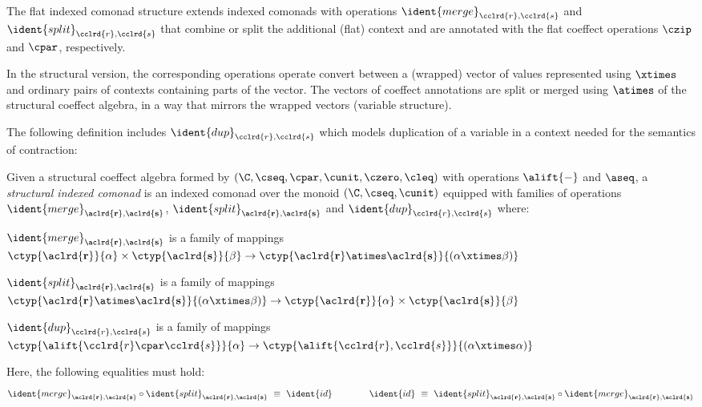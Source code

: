 The flat indexed comonad structure extends indexed comonads with operations
$\ident{merge}_{\cclrd{r},\cclrd{s}}$ and $\ident{split}_{\cclrd{r},\cclrd{s}}$ that combine or
split the additional (flat) context and are annotated with the flat coeffect operations $\czip$
and $\cpar$, respectively.

In the structural version, the corresponding operations operate convert between a (wrapped) vector
of values represented using $\xtimes$ and ordinary pairs of contexts containing parts of the vector.
The vectors of coeffect annotations are split or merged using $\atimes$ of the structural coeffect
algebra, in a way that mirrors the wrapped vectors (variable structure).

The following definition includes $\ident{dup}_{\cclrd{r}, \cclrd{s}}$ which models
duplication of a variable in a context needed for the semantics of contraction:

\begin{definition}
Given a structural coeffect algebra formed by $(\C, \cseq, \cpar, \cunit, \czero, \cleq)$
with operations $\alift{-}$ and $\aseq$, a \emph{structural indexed comonad} is an indexed comonad over
the monoid $(\C, \cseq, \cunit)$ equipped with families of operations $\ident{merge}_{\aclrd{\textbf{r}},\aclrd{\textbf{s}}}$,
$\ident{split}_{\aclrd{\textbf{r}},\aclrd{\textbf{s}}}$ and $\ident{dup}_{\cclrd{r}, \cclrd{s}}$ where:
%
\begin{compactitem}
\item $\ident{merge}_{\aclrd{\textbf{r}},\aclrd{\textbf{s}}}$ is a family of mappings
  $\ctyp{\aclrd{\textbf{r}}}{\alpha} \times \ctyp{\aclrd{\textbf{s}}}{\beta} \rightarrow \ctyp{\aclrd{\textbf{r}}\atimes\aclrd{\textbf{s}}}{(\alpha \xtimes \beta)}$
\item $\ident{split}_{\aclrd{\textbf{r}},\aclrd{\textbf{s}}}$ is a family of mappings
  $\ctyp{\aclrd{\textbf{r}}\atimes\aclrd{\textbf{s}}}{(\alpha \xtimes \beta)} \rightarrow \ctyp{\aclrd{\textbf{r}}}{\alpha} \times \ctyp{\aclrd{\textbf{s}}}{\beta}$
\item $\ident{dup}_{\cclrd{r}, \cclrd{s}}$ is a family of mappings
  $\ctyp{\alift{\cclrd{r} \cpar \cclrd{s}}}{\alpha} \rightarrow \ctyp{\alift{\cclrd{r}, \cclrd{s}}}{(\alpha \xtimes \alpha)}$
\end{compactitem}
%
Here, the following equalities must hold:
\begin{equation*}
\ident{merge}_{\aclrd{\textbf{r}},\aclrd{\textbf{s}}} \circ \ident{split}_{\aclrd{\textbf{r}},\aclrd{\textbf{s}}} ~\equiv~ \ident{id} \qquad\qquad
\ident{id} ~\equiv~ \ident{split}_{\aclrd{\textbf{r}},\aclrd{\textbf{s}}} \circ \ident{merge}_{\aclrd{\textbf{r}},\aclrd{\textbf{s}}}
\end{equation*}

\end{definition}

